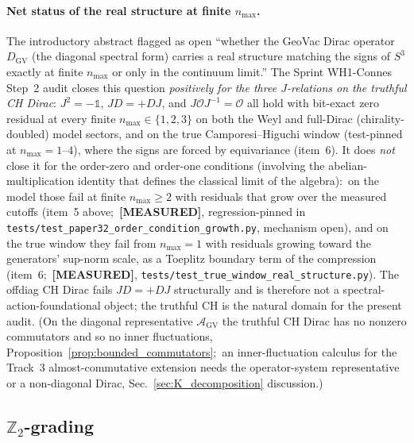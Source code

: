 \documentclass[11pt]{article}
\begin{document}
\paragraph{Net status of the real structure at finite
$n_{\max}$.}  The introductory abstract flagged as open
``whether the GeoVac Dirac operator $D_{\mathrm{GV}}$ (the diagonal spectral form) carries a real structure
matching the signs of $S^3$ exactly at finite $n_{\max}$ or only in
the continuum limit.''
The Sprint WH1-Connes Step~2 audit closes this question
\emph{positively for the three $J$-relations on the truthful CH
Dirac}: $J^2 = -\mathbb{1}$, $JD = +DJ$, and
$J \mathcal{O} J^{-1} = \mathcal{O}$ all hold with bit-exact zero
residual at every finite $n_{\max} \in \{1, 2, 3\}$ on both the Weyl
and full-Dirac (chirality-doubled) model sectors, and on the true
Camporesi--Higuchi window (test-pinned at $n_{\max} = 1$--$4$), where the
signs are forced by equivariance (item~6).  It does \emph{not} close it
for the order-zero and order-one conditions (involving the
abelian-multiplication identity that defines the classical limit of the
algebra):\ on the model those fail at finite $n_{\max} \ge 2$ with
residuals that grow over the measured cutoffs (item~5 above;\
\textbf{[MEASURED]}, regression-pinned in
\texttt{tests/test\_paper32\_order\_condition\_growth.py}, mechanism
open), and on the true window they fail from $n_{\max} = 1$ with
residuals growing toward the generators' sup-norm scale, as a Toeplitz
boundary term of the compression (item~6;\ \textbf{[MEASURED]},
\texttt{tests/test\_true\_window\_real\_structure.py}).
The offdiag CH Dirac fails $JD = +DJ$ structurally and is therefore
not a spectral-action-foundational object; the truthful CH is the
natural domain for the present audit.  (On the diagonal representative
$\mathcal{A}_{\mathrm{GV}}$ the truthful CH Dirac has no nonzero
commutators and so no inner fluctuations,
Proposition~\ref{prop:bounded_commutators};\ an inner-fluctuation
calculus for the Track~3 almost-commutative extension needs the
operator-system representative or a non-diagonal Dirac,
Sec.~\ref{sec:K_decomposition} discussion.)

\subsection{$\mathbb{Z}_2$-grading}
\end{document}
